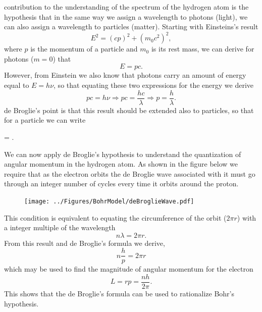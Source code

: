 contribution to the understanding of the spectrum of the hydrogen atom is the hypothesis that in the same way we assign a wavelength to photons (light), we can also assign a wavelength to particles (matter).
Starting with Einsteins's result
\begin{equation}
E^2 = (cp)^2 + (m_0 c^2)^2,
\end{equation}
where $p$ is the momentum of a particle and $m_0$ is its rest mass, we can derive for photons ($m = 0$) that
\begin{equation}
E = pc.
\end{equation}
However, from Einstein we also know that photons carry an amount of energy equal to $E = h \nu$, so that equating these two expressions for the energy we derive
\begin{equation}
pc = h \nu \Rightarrow pc = \frac{hc}{\lambda}  \Rightarrow p = \frac{h}{\lambda}.
\end{equation}
de Broglie's point is that this result should be extended also to particles, so that for a particle we can write
\begin{iequation}
\lambda = .
\end{iequation}

We can now apply de Broglie's hypothesis to understand the quantization of angular momentum in the hydrogen atom.
As shown in the figure below we require that as the electron orbits the de Broglie wave associated with it must go through an integer number of cycles every time it orbits around the proton. 
\begin{figure}[htbp]
   \centering
   \texttt{[image: ../Figures/BohrModel/deBroglieWave.pdf]} %
\end{figure}

This condition is equivalent to equating the circumference of the orbit ($ 2 \pi r$) with a integer multiple of the wavelength
\begin{equation}
n \lambda = 2 \pi r.
\end{equation}
From this result and de Broglie's formula we derive,
\begin{equation}
n \frac{h}{p} = 2 \pi r
\end{equation}
which may be used to find the magnitude of angular momentum for the electron
\begin{equation}
\label{eq:bohr:angular_momentum}
L = r p = \frac{n h}{2 \pi}.
\end{equation}
 This shows that the de Broglie's formula can be used to rationalize Bohr's hypothesis.
 
